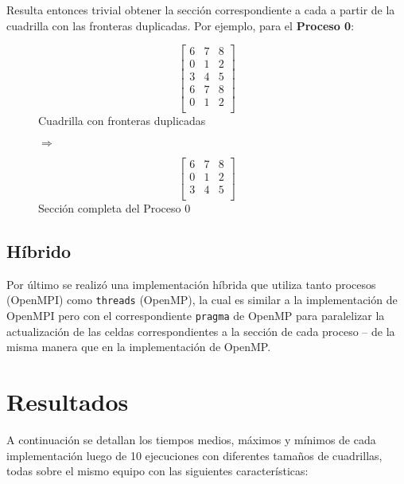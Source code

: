 \documentclass[a4paper,12pt]{article}
\begin{document}
Resulta entonces trivial obtener la sección correspondiente a cada a partir de la cuadrilla con las fronteras duplicadas. Por ejemplo, para el \textbf{Proceso 0}:

\begin{figure}[H]
    \begin{minipage}{.5\linewidth}
        \centering
        \[
            \begin{bmatrix}
                6 & 7 & 8 \\
                0 & 1 & 2 \\
                3 & 4 & 5 \\
                6 & 7 & 8 \\
                0 & 1 & 2 \\
            \end{bmatrix}
        \]
        Cuadrilla con fronteras duplicadas
    \end{minipage}%
    $\Rightarrow$
    \begin{minipage}{.5\linewidth}
        \centering
        \[
            \begin{bmatrix}
                6 & 7 & 8 \\
                0 & 1 & 2 \\
                3 & 4 & 5 \\
            \end{bmatrix}
        \]
        Sección completa del Proceso 0
    \end{minipage}%
\end{figure}

\subsection{Híbrido}

Por último se realizó una implementación híbrida que utiliza tanto procesos (OpenMPI) como \verb|threads| (OpenMP), la cual es similar a la implementación de OpenMPI pero con el correspondiente \verb|pragma| de OpenMP para paralelizar la actualización de las celdas correspondientes a la sección de cada proceso -- de la misma manera que en la implementación de OpenMP.

\section{Resultados}

A continuación se detallan los tiempos medios, máximos y mínimos de cada implementación luego de 10 ejecuciones con diferentes tamaños de cuadrillas, todas sobre el mismo equipo con las siguientes características:
\end{document}
